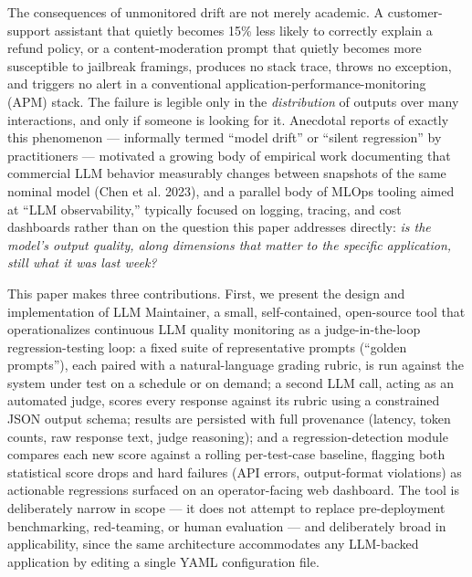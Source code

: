 \documentclass[11pt,a4paper]{article}
\begin{document}
The consequences of unmonitored drift are not merely academic. A
customer-support assistant that quietly becomes 15\% less likely to
correctly explain a refund policy, or a content-moderation prompt that
quietly becomes more susceptible to jailbreak framings, produces no
stack trace, throws no exception, and triggers no alert in a
conventional application-performance-monitoring (APM) stack. The failure
is legible only in the \emph{distribution} of outputs over many
interactions, and only if someone is looking for it. Anecdotal reports
of exactly this phenomenon --- informally termed ``model drift'' or
``silent regression'' by practitioners --- motivated a growing body of
empirical work documenting that commercial LLM behavior measurably
changes between snapshots of the same nominal model (Chen et al. 2023),
and a parallel body of MLOps tooling aimed at ``LLM observability,''
typically focused on logging, tracing, and cost dashboards rather than
on the question this paper addresses directly: \emph{is the
model's output quality, along dimensions that matter to
the specific application, still what it was last week?}

This paper makes three contributions. First, we present the design and
implementation of LLM Maintainer, a small, self-contained, open-source
tool that operationalizes continuous LLM quality monitoring as a
judge-in-the-loop regression-testing loop: a fixed suite of
representative prompts (``golden prompts''), each paired with a
natural-language grading rubric, is run against the system under test on
a schedule or on demand; a second LLM call, acting as an automated
judge, scores every response against its rubric using a constrained JSON
output schema; results are persisted with full provenance (latency,
token counts, raw response text, judge reasoning); and a
regression-detection module compares each new score against a rolling
per-test-case baseline, flagging both statistical score drops and hard
failures (API errors, output-format violations) as actionable
regressions surfaced on an operator-facing web dashboard. The tool is
deliberately narrow in scope --- it does not attempt to replace
pre-deployment benchmarking, red-teaming, or human evaluation --- and
deliberately broad in applicability, since the same architecture
accommodates any LLM-backed application by editing a single YAML
configuration file.
\end{document}

